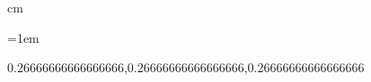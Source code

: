
 cm

\usepackage{tasks}

\usepackage{circuitikz}

\parindent=0cm
\parskip=1em

\newcommand{\calL}{\mathcal{L}}
\newcommand{\sen}{\mathup{sen}}
\newcommand{\un}{{\mathcal U}}
\def\card{\textup{card}}

\newenvironment{solucion}[1]
{\begin{proof}[{\bf Soluci\'on a ejercicio #1}]}{\end{proof}}
\definecolor{uuuuuu}{rgb}
{0.26666666666666666,0.26666666666666666,0.26666666666666666}

\newtheorem*{pp}{Principio de Inducción}


